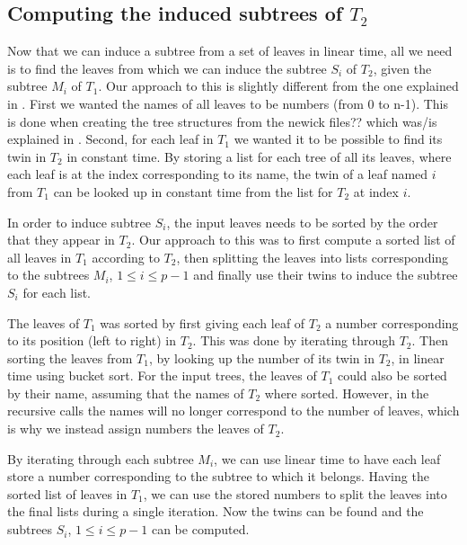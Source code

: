 \subsection{Computing the induced subtrees of $T_2$}
Now that we can induce a subtree from a set of leaves in linear time, all we need is to find the leaves from which we can induce the subtree $S_i$ of $T_2$, given the subtree $M_i$ of $T_1$. Our approach to this is slightly different from the one explained in \cite{nlogn} . First we wanted the names of all leaves to be numbers (from 0 to n-1). This is done when creating the tree structures from the newick files?? which was/is explained in . Second, for each leaf in $T_1$ we wanted it to be possible to find its twin in $T_2$ in constant time. By storing a list for each tree of all its leaves, where each leaf is at the index corresponding to its name, the twin of a leaf named $i$ from $T_1$ can be looked up in constant time from the list for $T_2$ at index $i$.

In order to induce subtree $S_i$, the input leaves needs to be sorted by the order that they appear in $T_2$. Our approach to this was to first compute a sorted list of all leaves in $T_1$ according to $T_2$, then splitting the leaves into lists corresponding to the subtrees $M_i$, $1 \le i \le p-1$ and finally use their twins to induce the subtree $S_i$ for each list.

The leaves of $T_1$ was sorted by first giving each leaf of $T_2$ a number corresponding to its position (left to right) in $T_2$. This was done by iterating through $T_2$. Then sorting the leaves from $T_1$, by looking up the number of its twin in $T_2$, in linear time using bucket sort.
For the input trees, the leaves of $T_1$ could also be sorted by their name, assuming that the names of $T_2$ where sorted. However, in the recursive calls the names will no longer correspond to the number of leaves, which is why we instead assign numbers the leaves of $T_2$.


By iterating through each subtree $M_i$, we can use linear time to have each leaf store a number corresponding to the subtree to which it belongs. Having the sorted list of leaves in $T_1$, we can use the stored numbers to split the leaves into the final lists during a single iteration. Now the twins can be found and the subtrees $S_i$, $1 \le i \le p-1$ can be computed.


